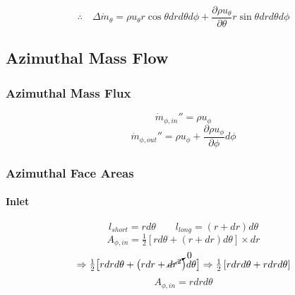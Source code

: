 \documentclass[12pt, letterpaper, twoside]{article}
\begin{document}
            \begin{equation}\label{eq:mdottheta}
                \therefore \quad \boxed{\Delta\dot{m}_{\theta} = 
                \rho u_{\theta} r\cos\theta dr d\theta d\phi + 
                \frac{\partial\rho u_{\theta}}{\partial\theta} r\sin\theta dr d\theta d\phi}
            \end{equation}
        
    \subsection{Azimuthal Mass Flow}
        \subsubsection{Azimuthal Mass Flux}
            \begin{equation}
                \dot{m}_{\phi,in}'' = \rho u_{\phi}
            \end{equation}
            \begin{equation}
                \dot{m}_{\phi,out}'' = \rho u_{\phi}  +
                \frac{\partial \rho u_{\phi}}{\partial \phi} d\phi
            \end{equation}

        \subsubsection{Azimuthal Face Areas}
        \paragraph{Inlet}
            \begin{equation*}
                l_{short} = r d\theta \qquad
                l_{long} = (r + dr) d\theta 
            \end{equation*}
            \begin{equation}\label{eq:Aphi_init}
                A_{\phi,in} = \tfrac{1}{2} \left[rd\theta + \left(r+dr\right)d\theta\right] \times dr
            \end{equation}
            \begin{equation*}
                \Rightarrow
                \tfrac{1}{2} \big[r dr d\theta +  \big(rdr + \cancelto{0}{dr^2}\big) d\theta \big] 
                \Rightarrow
                \tfrac{1}{2} \left[r dr d\theta + r dr d\theta\right]
            \end{equation*}
            \begin{equation}\label{eq:Athetain_final}
                A_{\phi,in} = r dr d\theta
            \end{equation}
\end{document}
